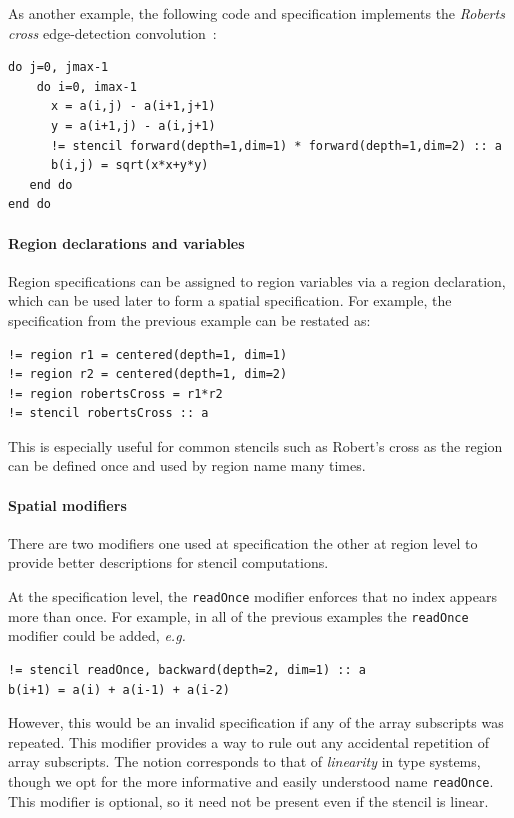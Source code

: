 \documentclass[9pt]{sigplanconf}
\theoremstyle{definition}
\newcommand{\eg}{\emph{e.g.}}
\begin{document}
As another example, the following code and specification
implements the \emph{Roberts cross}
edge-detection convolution~\cite{davis1975survey}:
\begin{verbatim}
do j=0, jmax-1
    do i=0, imax-1
      x = a(i,j) - a(i+1,j+1)
      y = a(i+1,j) - a(i,j+1)
      != stencil forward(depth=1,dim=1) * forward(depth=1,dim=2) :: a
      b(i,j) = sqrt(x*x+y*y)
   end do
end do
\end{verbatim}

\paragraph{Region declarations and variables}

Region specifications can be assigned to region variables via
a region declaration, which can be used later to form a spatial
specification. For example, the specification from the previous
 example can be restated as:
\begin{verbatim}
!= region r1 = centered(depth=1, dim=1)
!= region r2 = centered(depth=1, dim=2)
!= region robertsCross = r1*r2
!= stencil robertsCross :: a
\end{verbatim}
This is especially useful for common stencils such as Robert's cross
as the region can be defined once and used by region name many times.
\paragraph{Spatial modifiers}
There are two modifiers one used at specification the other at region
level to provide better descriptions for stencil computations.

At the specification level, the \texttt{readOnce} modifier enforces that no
index appears more than once. For example, in all of the previous examples the
\texttt{readOnce} modifier could be added, \eg{}
%
\begin{verbatim}
!= stencil readOnce, backward(depth=2, dim=1) :: a
b(i+1) = a(i) + a(i-1) + a(i-2)
\end{verbatim}
%
However, this would be an invalid specification if any of the
array subscripts was repeated. This modifier provides a way to
rule out any accidental repetition of array subscripts.
The notion corresponds to that of \emph{linearity} in type systems,
though we opt for the more informative and easily understood name
\texttt{readOnce}. This modifier is optional, so it need not
be present even if the stencil is linear.
\end{document}
